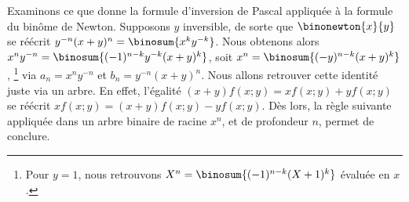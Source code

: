 \begin{remark}
    Examinons ce que donne la formule d'inversion de Pascal appliquée à la formule du binôme de Newton.
    Supposons $y$ inversible, de sorte que $\binonewton{x}{y}$ se réécrit $y^{-n}(x+y)^n = \binosum{x^k y^{-k}}$.
    Nous obtenons alors $x^n y^{-n} = \binosum{(-1)^{n-k} y^{-k} (x+y)^k}$,
    soit $x^n = \binosum{(- y)^{n-k} (x+y)^k}$,%
    \footnote{
    	Pour $y = 1$, nous retrouvons
		$X^n = \binosum{(-1)^{n-k} (X+1)^k}$
		évaluée en $x$.
    }
    via
    $a_ n = x^n y^{-n}$
    et
    $b_ n = y^{-n}(x+y)^n$.
    Nous allons retrouver cette identité juste via un arbre.
    En effet,
    l'égalité
    $(x + y)f(x ; y) = x f(x ; y) + y f(x ; y)$ se réécrit $x f(x ; y) = (x + y)f(x ; y) - y f(x ; y)$.
    Dès lors,
    la règle suivante appliquée dans un arbre binaire de racine $x^n$, et de profondeur $n$, permet de conclure.
    
                {\intertree}{}
\end{remark}
